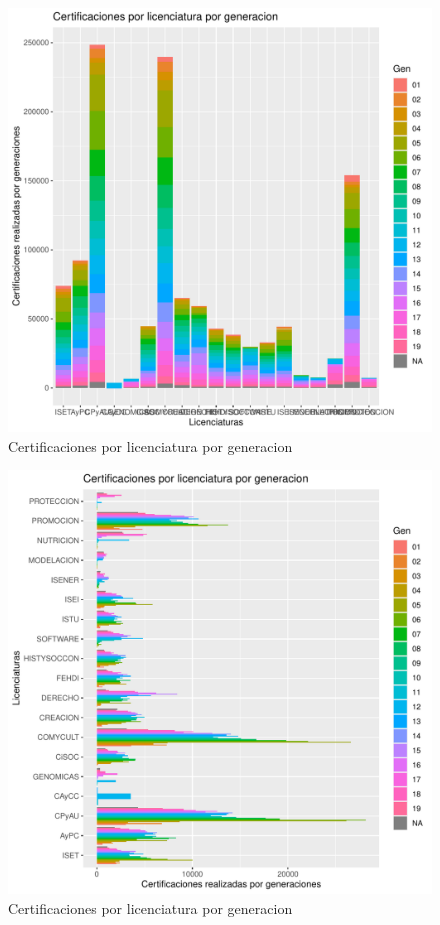 \documentclass[12pt]{article}
\begin{document}
\begin{figure}
\centering
\includegraphics[scale=0.45]{Graficas/ggplotBarplotLicGen.pdf}
\caption{Certificaciones por licenciatura por generacion}
\label{Fig.Cert.Lic-Gen}
\end{figure}

\begin{figure}
\centering
\includegraphics[scale=0.45]{Graficas/ggplotBarplotLicGen2.pdf}
\caption{Certificaciones por licenciatura por generacion}
\label{Fig.Cert.Lic-Gen2}
\end{figure}
\end{document}
